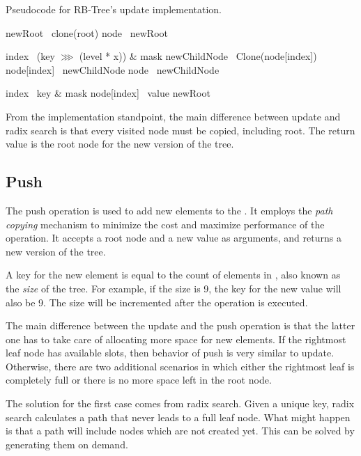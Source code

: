 \begin{listing}[ht!]
    \caption{Pseudocode for RB-Tree's update implementation.}
    \label{lst:rb-tree-update}

    \begin{algorithmic}
            \State newRoot \la\ clone(root)
            \State node \la\ newRoot

                \State index \la\ (key $\ggg$ (level * x)) \& mask
                \State newChildNode \la\ Clone(node[index])
                \State node[index] \la\ newChildNode
                \State node \la\ newChildNode
            \EndFor

            \State index \la\ key \& mask
            \State node[index] \la\ value
            \State \Return newRoot
        \EndFunction
    \end{algorithmic}
\end{listing}

From the implementation standpoint, the main difference between update and radix search is that every visited node must be copied, including root. The return value is the root node for the new version of the tree.

\subsection{Push}
The push operation is used to add new elements to the \rbtree{}. It employs the \emph{path copying} mechanism to minimize the cost and maximize performance of the operation. It accepts a root node and a new value as arguments, and returns a new version of the tree.

A key for the new element is equal to the count of elements in \rbtree{}, also known as the \emph{size} of the tree. For example, if the size is 9, the key for the new value will also be 9. The size will be incremented after the operation is executed.

The main difference between the update and the push operation is that the latter one has to take care of allocating more space for new elements. If the rightmost leaf node has available slots, then behavior of push is very similar to update. Otherwise, there are two additional scenarios in which either the rightmost leaf is completely full or there is no more space left in the root node.

The solution for the first case comes from radix search. Given a unique key, radix search calculates a path that never leads to a full leaf node. What might happen is that a path will include nodes which are not created yet. This can be solved by generating them on demand.

